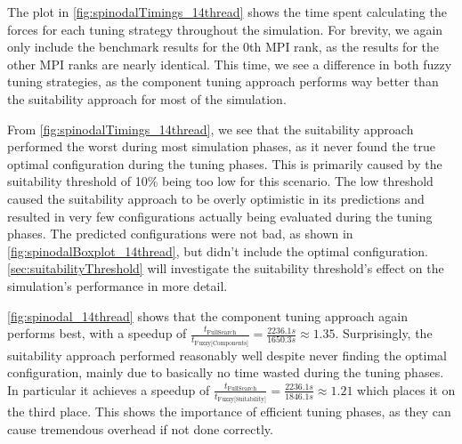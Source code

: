The plot in \autoref{fig:spinodalTimings_14thread} shows the time spent calculating the forces for each tuning strategy throughout the simulation. For brevity, we again only include the benchmark results for the 0th MPI rank, as the results for the other MPI ranks are nearly identical. This time, we see a difference in both fuzzy tuning strategies, as the component tuning approach performs way better than the suitability approach for most of the simulation.

From \autoref{fig:spinodalTimings_14thread}, we see that the suitability approach performed the worst during most simulation phases, as it never found the true optimal configuration during the tuning phases. This is primarily caused by the suitability threshold of 10\% being too low for this scenario. The low threshold caused the suitability approach to be overly optimistic in its predictions and resulted in very few configurations actually being evaluated during the tuning phases. The predicted configurations were not bad, as shown in \autoref{fig:spinodalBoxplot_14thread}, but didn't include the optimal configuration. \autoref{sec:suitabilityThreshold} will investigate the suitability threshold's effect on the simulation's performance in more detail.

\autoref{fig:spinodal_14thread} shows that the component tuning approach again performs best, with a speedup of $\frac{t_{\text{FullSearch}}}{t_{\text{Fuzzy[Components]}}} = \frac{2236.1s}{1650.3s} \approx 1.35$. Surprisingly, the suitability approach performed reasonably well despite never finding the optimal configuration, mainly due to basically no time wasted during the tuning phases. In particular it achieves a speedup of $\frac{t_{\text{FullSearch}}}{t_{\text{Fuzzy[Suitability]}}} = \frac{2236.1s}{1846.1s} \approx 1.21$ which places it on the third place. This shows the importance of efficient tuning phases, as they can cause tremendous overhead if not done correctly.

\newpage

